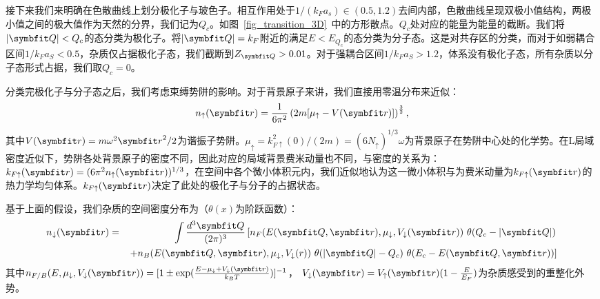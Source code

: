 接下来我们来明确在色散曲线上划分极化子与玻色子。相互作用处于$1/(k_Fa_s)\in(0.5,1.2)$去间内部，色散曲线呈现双极小值结构，两极小值之间的极大值作为天然的分界，我们记为$Q_c$。如图~\ref{fig_transition_3D}~中的方形散点。$Q_c$处对应的能量为能量的截断。我们将$|\Vector{Q}|<Q_c$的态分类为极化子。将$|\Vector{Q}|=k_F$附近的满足$E<E_{Q_c}$的态分类为分子态。这是对共存区的分类，而对于如弱耦合区间$1/k_Fa_S<0.5$，杂质仅占据极化子态，我们截断到$Z_{\Vector{Q}}>0.01$。对于强耦合区间$1/k_Fa_S>1.2$，体系没有极化子态，所有杂质以分子态形式占据，我们取$Q_c=0$。

分类完极化子与分子态之后，我们考虑束缚势阱的影响。对于背景原子来讲，我们直接用零温分布来近似：
\begin{equation}
	n_{\uparrow}(\Vector{r}) = \frac{1}{6\pi^2} \left( 2m [\mu_{\uparrow} - V(\Vector{r})]\right)^{\frac{3}{2}},
\end{equation}
其中$V(\Vector{r})=m\omega^2{\Vector{r} }^2/2$为谐振子势阱。$\mu_{\uparrow}=k^2_{F{\uparrow}}(0)/(2m)  = (6 N_{\uparrow})^{1/3} \omega$为背景原子在势阱中心处的化学势。在L局域密度近似下，势阱各处背景原子的密度不同，因此对应的局域背景费米动量也不同，与密度的关系为：
$k_{F\uparrow}(\Vector{r}) = (6\pi^2n_{\uparrow}(\Vector{r}))^{1/3}$，在空间中各个微小体积元内，我们近似地认为这一微小体积与为费米动量为$k_{F\uparrow}(\Vector{r})$的热力学均匀体系。$k_{F\uparrow}(\Vector{r})$决定了此处的极化子与分子的占据状态。

基于上面的假设，我们杂质的空间密度分布为（$\theta(x)$为阶跃函数）：
\begin{eqnarray}
	n_{\downarrow}(\Vector{r}) &=& \int\frac{d^3{\Vector{Q} }}{(2\pi)^3} \left[  n_F(E({\Vector{Q} },{\Vector{r} }),\mu_\downarrow,V_\downarrow({\Vector{r} }))\ \theta(Q_{c}-|{\Vector{Q} }|) \right. \nonumber\\
	&&\left.+ n_B(E({\Vector{Q} },{\Vector{r} }),\mu_\downarrow,V_\downarrow(r) )\ \theta(|{\Vector{Q} }|-Q_c)\ \theta(E_c-E({\Vector{Q} },{\Vector{r} })) \right] \nonumber\\ \label{local_n}
\end{eqnarray}
其中$n_{F/B}(E,\mu_\downarrow,V_\downarrow(\Vector{r})) = [1 \pm \exp(\frac{E-\mu_\downarrow+V_\downarrow(\Vector{r})}{k_B T}) ]^{-1}$， $V_\downarrow(\Vector{r})= V_\uparrow(\Vector{r}) (1- \frac{E}{E_F})$为杂质感受到的重整化外势\cite{Sagi2020,Lobo2006normal}。

